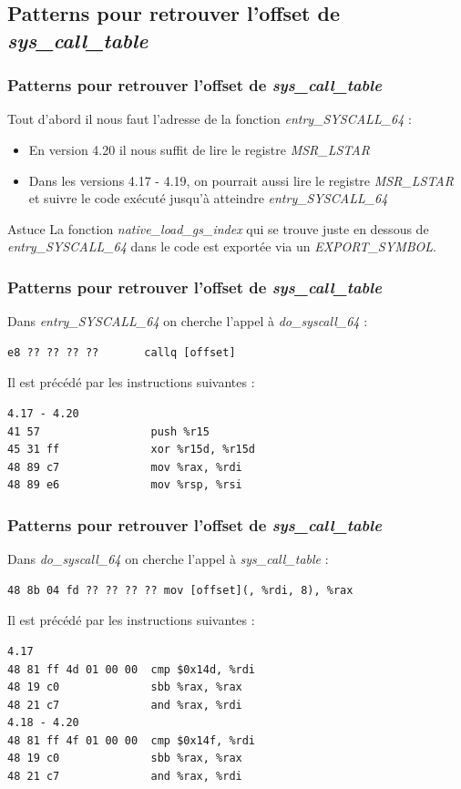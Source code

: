 \documentclass{beamer}
\begin{document}
\subsection{Patterns pour retrouver l'offset de \textit{sys\_call\_table}}
\begin{frame}[fragile]
\frametitle{Patterns pour retrouver l'offset de \textit{sys\_call\_table}}
Tout d'abord il nous faut l'adresse de la fonction \textit{entry\_SYSCALL\_64} :
\begin{itemize}
\item 	En version 4.20 il nous suffit de lire le registre \textit{MSR\_LSTAR}
\item 	Dans les versions 4.17 - 4.19, on pourrait aussi lire le registre \textit{MSR\_LSTAR} et suivre le code exécuté jusqu'à atteindre \textit{entry\_SYSCALL\_64}
\end{itemize}
\begin{block}{Astuce}
La fonction \textit{native\_load\_gs\_index} qui se trouve juste en dessous de \textit{entry\_SYSCALL\_64} dans le code est exportée via un \textit{EXPORT\_SYMBOL}.
\end{block}
\end{frame}
\begin{frame}[fragile]
\frametitle{Patterns pour retrouver l'offset de \textit{sys\_call\_table}}
Dans \textit{entry\_SYSCALL\_64} on cherche l'appel à \textit{do\_syscall\_64} :
\begin{lstlisting}[style=CStyle]
e8 ?? ?? ?? ??       callq [offset]
\end{lstlisting}
\medskip
Il est précédé par les instructions suivantes :
\begin{lstlisting}[style=CStyle]
4.17 - 4.20
41 57                 push %r15  
45 31 ff              xor %r15d, %r15d  
48 89 c7              mov %rax, %rdi  
48 89 e6              mov %rsp, %rsi  
\end{lstlisting}
\end{frame}
\begin{frame}[fragile]
\frametitle{Patterns pour retrouver l'offset de \textit{sys\_call\_table}}
Dans \textit{do\_syscall\_64} on cherche l'appel à \textit{sys\_call\_table} :
\begin{lstlisting}[style=CStyle]
48 8b 04 fd ?? ?? ?? ?? mov [offset](, %rdi, 8), %rax
\end{lstlisting}
\medskip
Il est précédé par les instructions suivantes :
\begin{lstlisting}[style=CStyle]
4.17  
48 81 ff 4d 01 00 00  cmp $0x14d, %rdi  
48 19 c0              sbb %rax, %rax  
48 21 c7              and %rax, %rdi  
4.18 - 4.20  
48 81 ff 4f 01 00 00  cmp $0x14f, %rdi  
48 19 c0              sbb %rax, %rax  
48 21 c7              and %rax, %rdi  
\end{lstlisting}
\end{frame}
\end{document}
